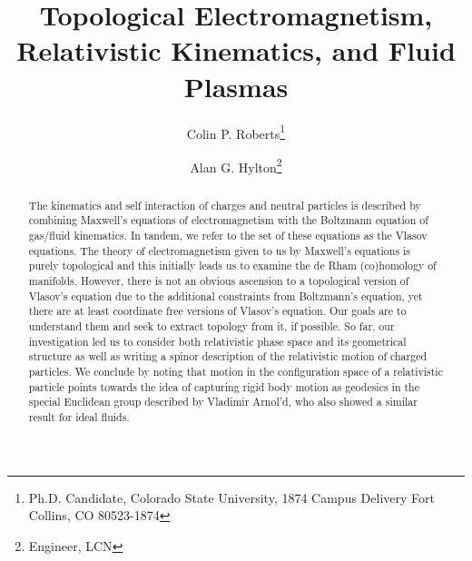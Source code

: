 \documentclass[conf]{new-aiaa}
\title{Topological Electromagnetism, Relativistic Kinematics, and Fluid Plasmas}
\author{Colin P. Roberts\footnote{Ph.D. Candidate, Colorado State University, 1874 Campus Delivery Fort Collins, CO 80523-1874}}
\affil{Colorado State University, Fort Collins, Colorado, 80523}
\author{Alan G. Hylton\footnote{Engineer, LCN}}
\affil{NASA Glenn Research Center, Cleveland, Ohio, 44135, USA}
\begin{document}
\maketitle

\begin{abstract}
The kinematics and self interaction of charges and neutral particles is described by combining Maxwell's equations of electromagnetism with the Boltzmann equation of gas/fluid kinematics. In tandem, we refer to the set of these equations as the Vlasov equations. The theory of electromagnetism given to us by Maxwell's equations is purely topological and this initially leads us to examine the de Rham (co)homology of manifolds. However, there is not an obvious ascension to a topological version of Vlasov's equation due to the additional constraints from Boltzmann's equation, yet there are at least coordinate free versions of Vlasov's equation. Our goals are to understand them and seek to extract topology from it, if possible. So far, our investigation led us to consider both relativistic phase space and its geometrical structure as well as writing a spinor description of the relativistic motion of charged particles. We conclude by noting that motion in the configuration space of a relativistic particle points towards the idea of capturing rigid body motion as geodesics in the special Euclidean group described by Vladimir Arnol'd, who also showed a similar result for ideal fluids.
\end{abstract}

%
\end{document}

